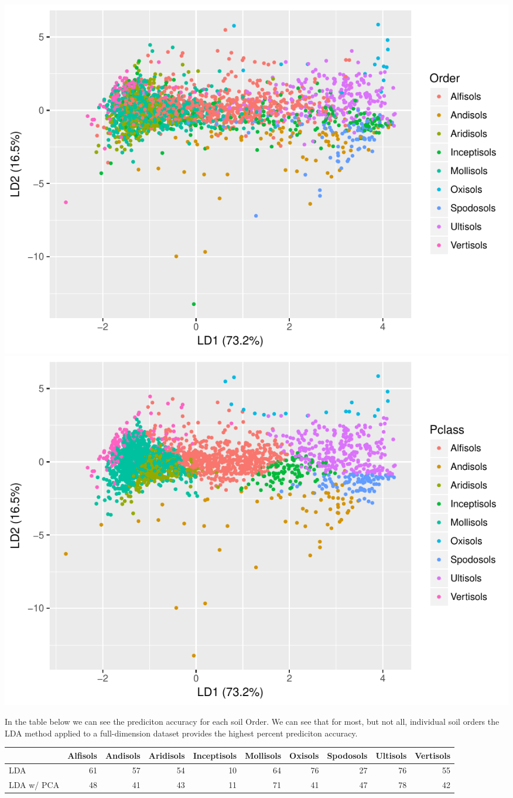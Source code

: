 \documentclass[]{article}
\begin{document}
\includegraphics{Project1_files/figure-latex/LDA with PCA - Fei-1.pdf}
\includegraphics{Project1_files/figure-latex/LDA with PCA - Fei-2.pdf}

In the table below we can see the prediciton accuracy for each soil
Order. We can see that for most, but not all, individual soil orders the
LDA method applied to a full-dimension dataset provides the highest
percent prediciton accuracy.

\begin{longtable}[]{@{}lrrrrrrrrr@{}}
\toprule
& Alfisols & Andisols & Aridisols & Inceptisols & Mollisols & Oxisols &
Spodosols & Ultisols & Vertisols\tabularnewline
\midrule
\endhead
LDA & 61 & 57 & 54 & 10 & 64 & 76 & 27 & 76 & 55\tabularnewline
LDA w/ PCA & 48 & 41 & 43 & 11 & 71 & 41 & 47 & 78 & 42\tabularnewline
\bottomrule
\end{longtable}
\end{document}
